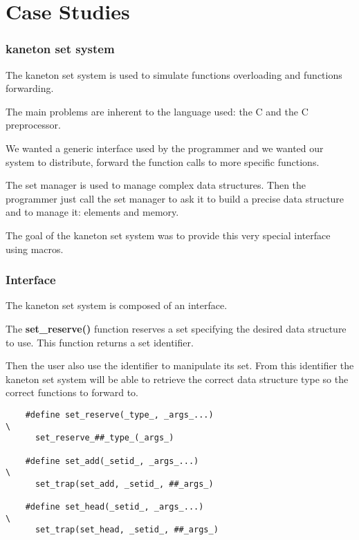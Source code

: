 %
%

\section{Case Studies}


\begin{frame}
  \frametitle{kaneton set system}

  The kaneton set system is used to simulate functions overloading and
  functions forwarding.

  \nl

  The main problems are inherent to the language used: the C and the C
  preprocessor.

  \nl

  We wanted a generic interface used by the programmer and we wanted our
  system to distribute, forward the function calls to more specific
  functions.

  \nl

  The set manager is used to manage complex data structures. Then the
  programmer just call the set manager to ask it to build a precise data
  structure and to manage it: elements and memory.

  \nl

  The goal of the kaneton set system was to provide this very special
  interface using macros.
\end{frame}


\begin{frame}[containsverbatim]
  \frametitle{Interface}

  The kaneton set system is composed of an interface.

  \nl

  The \textbf{set\_reserve()} function reserves a set specifying the desired
  data structure to use. This function returns a set identifier.

  \nl

  Then the user also use the identifier to manipulate its set. From this
  identifier the kaneton set system will be able to retrieve the correct
  data structure type so the correct functions to forward to.

  \begin{verbatim}
    #define set_reserve(_type_, _args_...)                                  \
      set_reserve_##_type_(_args_)

    #define set_add(_setid_, _args_...)                                     \
      set_trap(set_add, _setid_, ##_args_)

    #define set_head(_setid_, _args_...)                                    \
      set_trap(set_head, _setid_, ##_args_)
  \end{verbatim}
\end{frame}

